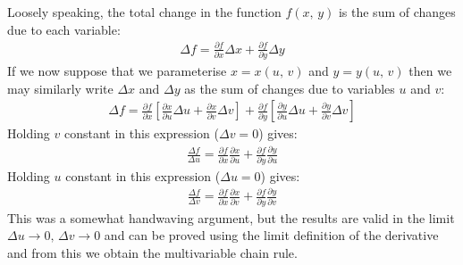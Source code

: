 \documentclass[letterpaper,10pt,english]{jupyterBook}
\begin{document}
\sphinxAtStartPar
Loosely speaking, the total change in the function \(f(x,\, y)\) is the sum of changes due to each variable:
\begin{equation*}
\begin{split}\Delta f = \frac{\partial f}{\partial x}\Delta x + \frac{\partial f}{\partial y}\Delta y\end{split}
\end{equation*}
\sphinxAtStartPar
If we now suppose that we parameterise \(x=x(u,\, v)\) and \(y=y(u,\, v)\) then we may similarly write \(\Delta x\) and \(\Delta y\) as the sum of changes
due to variables \(u\) and \(v\):
\begin{equation*}
\begin{split}\Delta f = \frac{\partial f}{\partial x}\left[\frac{\partial x}{\partial u}\Delta u +\frac{\partial x}{\partial v}\Delta v\right] 
+ \frac{\partial f}{\partial y}\left[\frac{\partial y}{\partial u}\Delta u +\frac{\partial y}{\partial v}\Delta v\right]\end{split}
\end{equation*}
\sphinxAtStartPar
Holding \(v\) constant in this expression (\(\Delta v=0\)) gives:
\begin{equation*}
\begin{split}\frac{\Delta f}{\Delta u}=\frac{\partial f}{\partial x}\frac{\partial x}{\partial u}+\frac{\partial f}{\partial y}\frac{\partial y}{\partial u}\end{split}
\end{equation*}
\sphinxAtStartPar
Holding \(u\) constant in this expression (\(\Delta u=0\)) gives:
\begin{equation*}
\begin{split}\frac{\Delta f}{\Delta v}=\frac{\partial f}{\partial x}\frac{\partial x}{\partial v}+\frac{\partial f}{\partial y}\frac{\partial y}{\partial v}\end{split}
\end{equation*}
\sphinxAtStartPar
This was a somewhat hand\sphinxhyphen{}waving argument, but the results are valid in the limit \(\Delta u\rightarrow 0, \, \Delta v\rightarrow 0\) and can be proved
using the limit definition of the derivative and from this we obtain the multivariable chain rule.
\end{document}
